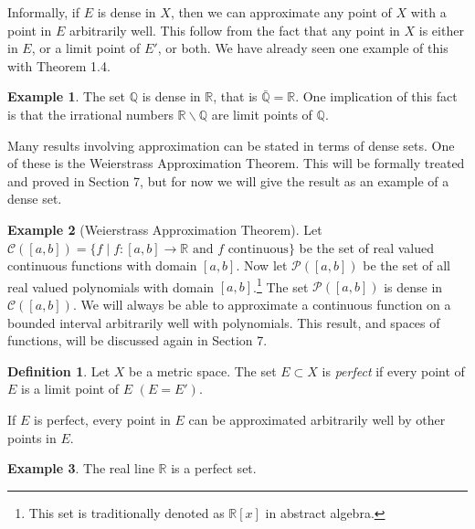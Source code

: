\documentclass{article}
\newcommand{\R}{\mathbb{R}}
\newcommand{\Q}{\mathbb{Q}}
\theoremstyle{definition}
\newtheorem{definition}{Definition}[section]
\newtheorem{example}{Example}[section]
\begin{document}
Informally, if $ E $ is dense in $ X $, then we can approximate any point of $ X $ with a point in $ E $ arbitrarily well. This follow from the fact that any point in $ X $ is either in $ E $, or a limit point of $ E' $, or both.  We have already seen one example of this with Theorem 1.4.
\begin{example}
	The set $ \Q $ is dense in $ \R $, that is $ \bar{\Q}=\R $. One implication of this fact is that the irrational numbers $ \R\backslash\Q $ are limit points of $ \Q $. 
\end{example}
Many results involving approximation can be stated in terms of dense sets. One of these is the Weierstrass Approximation Theorem. This will be formally treated and proved in Section 7, but for now we will give the result as an example of a dense set.
\begin{example}[Weierstrass Approximation Theorem]
	Let $ \mathscr{C}([a,b])=\{f\mid f:[a,b]\to \R\text{ and } f\text{ continuous}\} $ be the set of real valued continuous functions with domain $ [a,b] $. Now let $ \mathscr{P}([a,b]) $ be the set of all real valued polynomials with domain $ [a,b] $.\footnote{This set is traditionally denoted as $ \R[x] $ in abstract algebra.} The set $ \mathscr{P}([a,b])  $ is dense in $ \mathscr{C}([a,b]) $. We will always be able to approximate a continuous function on a bounded interval arbitrarily well with polynomials. This result, and spaces of functions, will be discussed again in Section 7. 
\end{example}
\begin{definition}
	Let $ X $ be a metric space. The set $ E\subset X $ is \textit{\color{red}perfect} if every point of $ E $ is a limit point of $ E $ $ (E=E') $. 
\end{definition}
If $ E $ is perfect, every point in $ E $ can be approximated arbitrarily well by other points in $ E $. 
\begin{example}
	The real line $ \R $ is a perfect set. 
\end{example}
\end{document}
